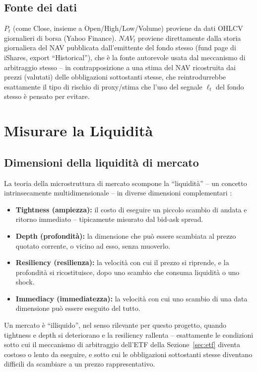 \documentclass[11pt]{article}
\theoremstyle{definition}
\theoremstyle{remark}
\begin{document}
\subsection{Fonte dei dati}

$P_t$ (come Close, insieme a Open/High/Low/Volume) proviene da dati OHLCV giornalieri di borsa (Yahoo Finance). $NAV_t$ proviene direttamente dalla storia giornaliera del NAV pubblicata dall'emittente del fondo stesso (fund page di iShares, export ``Historical''), che \`e la fonte autorevole usata dal meccanismo di arbitraggio stesso -- in contrapposizione a una stima del NAV ricostruita dai prezzi (valutati) delle obbligazioni sottostanti stesse, che reintrodurrebbe esattamente il tipo di rischio di proxy/stima che l'uso del segnale $\ell_t$ del fondo stesso \`e pensato per evitare.

\section{Misurare la Liquidit\`a}
\label{sec:liquidity}

\subsection{Dimensioni della liquidit\`a di mercato}

La teoria della microstruttura di mercato scompone la ``liquidit\`a'' -- un concetto intrinsecamente multidimensionale -- in diverse dimensioni complementari \cite{kyle1985continuous}:
\begin{itemize}
    \item \textbf{Tightness (ampiezza):} il costo di eseguire un piccolo scambio di andata e ritorno immediato -- tipicamente misurato dal bid-ask spread.
    \item \textbf{Depth (profondit\`a):} la dimensione che pu\`o essere scambiata al prezzo quotato corrente, o vicino ad esso, senza muoverlo.
    \item \textbf{Resiliency (resilienza):} la velocit\`a con cui il prezzo si riprende, e la profondit\`a si ricostituisce, dopo uno scambio che consuma liquidit\`a o uno shock.
    \item \textbf{Immediacy (immediatezza):} la velocit\`a con cui uno scambio di una data dimensione pu\`o essere eseguito del tutto.
\end{itemize}
Un mercato \`e ``illiquido'', nel senso rilevante per questo progetto, quando tightness e depth si deteriorano e la resiliency rallenta -- esattamente le condizioni sotto cui il meccanismo di arbitraggio dell'ETF della Sezione~\ref{sec:etf} diventa costoso o lento da eseguire, e sotto cui le obbligazioni sottostanti stesse diventano difficili da scambiare a un prezzo rappresentativo.
\end{document}
